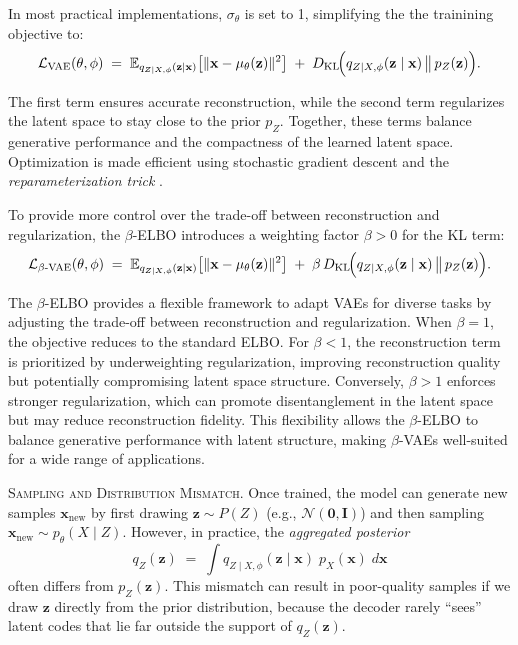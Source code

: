 In most practical implementations, \(\sigma_\theta\) is set to 1, simplifying the the trainining objective to:
\[
\mathcal{L}_{\text{VAE}}(\theta, \phi)
\;=\;
\mathbb{E}_{q_{Z \mid X, \phi}(\mathbf{z} \mid \mathbf{x})}
\bigl[\|\mathbf{x} - \mu_\theta(\mathbf{z})\|^2\bigr]
\;+\;
D_{\mathrm{KL}}\!\Bigl(
    q_{Z \mid X,\phi}(\mathbf{z}\mid \mathbf{x})
    \,\bigl\|\,
    p_{Z}(\mathbf{z})
\Bigr).
\]

The first term ensures accurate reconstruction, while the second term regularizes the latent space to stay close to the prior \(p_Z\). Together, these terms balance generative performance and the compactness of the learned latent space. Optimization is made efficient using stochastic gradient descent and the \emph{reparameterization trick} \citep{kingma2013auto}.

To provide more control over the trade-off between reconstruction and regularization, the \(\beta\)-ELBO \citep{higgins2017beta} introduces a weighting factor \(\beta > 0\) for the KL term:
\[
\mathcal{L}_{\beta\text{-VAE}}(\theta, \phi)
\;=\;
\mathbb{E}_{q_{Z \mid X, \phi}(\mathbf{z} \mid \mathbf{x})}
\bigl[\|\mathbf{x} - \mu_\theta(\mathbf{z})\|^2\bigr]
\;+\;
\beta \, D_{\mathrm{KL}}\!\Bigl(
    q_{Z \mid X,\phi}(\mathbf{z}\mid \mathbf{x})
    \,\bigl\|\,
    p_{Z}(\mathbf{z})
\Bigr).
\]

The \(\beta\)-ELBO provides a flexible framework to adapt VAEs for diverse tasks by adjusting the trade-off between reconstruction and regularization. When \(\beta = 1\), the objective reduces to the standard ELBO. For \(\beta < 1\), the reconstruction term is prioritized by underweighting regularization, improving reconstruction quality but potentially compromising latent space structure. Conversely, \(\beta > 1\) enforces stronger regularization, which can promote disentanglement in the latent space but may reduce reconstruction fidelity. This flexibility allows the \(\beta\)-ELBO to balance generative performance with latent structure, making \(\beta\)-VAEs well-suited for a wide range of applications.

\textsc{Sampling and Distribution Mismatch.} Once trained, the model can generate new samples \(\mathbf{x}_{\text{new}}\) by first drawing \(\mathbf{z} \sim P(Z)\) (e.g., \(\mathcal{N}(\mathbf{0}, \mathbf{I})\)) and then sampling \(\mathbf{x}_{\text{new}} \sim p_{\theta}(X \mid Z)\). However, in practice, the \emph{aggregated posterior}
\[
q_{Z}(\mathbf{z}) 
\;=\;
\int
q_{Z \mid X,\phi}(\mathbf{z}\mid \mathbf{x})
\;p_{X}(\mathbf{x})
\;d\mathbf{x}
\]
often differs from \(p_{Z}(\mathbf{z})\). This mismatch can result in poor-quality samples if we draw \(\mathbf{z}\) directly from the prior distribution, because the decoder rarely “sees” latent codes that lie far outside the support of \(q_{Z}(\mathbf{z})\).

